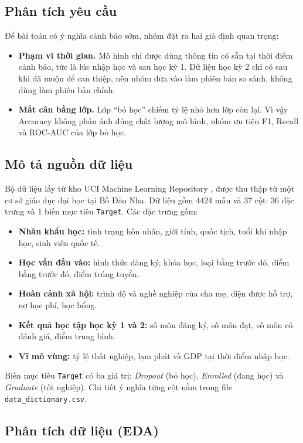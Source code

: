 \documentclass[12pt,a4paper]{article}
\begin{document}
\subsection{Phân tích yêu cầu}
Để bài toán có ý nghĩa cảnh báo sớm, nhóm đặt ra hai giả định quan trọng:
\begin{itemize}
  \item \textbf{Phạm vi thời gian.} Mô hình chỉ được dùng thông tin có sẵn tại thời điểm cảnh báo, tức là lúc nhập học và sau học kỳ 1. Dữ liệu học kỳ 2 chỉ có sau khi đã muộn để can thiệp, nên nhóm đưa vào làm phiên bản so sánh, không dùng làm phiên bản chính.
  \item \textbf{Mất cân bằng lớp.} Lớp ``bỏ học'' chiếm tỷ lệ nhỏ hơn lớp còn lại. Vì vậy Accuracy không phản ánh đúng chất lượng mô hình, nhóm ưu tiên F1, Recall và ROC-AUC của lớp bỏ học.
\end{itemize}

\subsection{Mô tả nguồn dữ liệu}
Bộ dữ liệu lấy từ kho UCI Machine Learning Repository \cite{realinho2021}, được thu thập từ một cơ sở giáo dục đại học tại Bồ Đào Nha. Dữ liệu gồm 4424 mẫu và 37 cột: 36 đặc trưng và 1 biến mục tiêu \texttt{Target}. Các đặc trưng gồm:
\begin{itemize}
  \item \textbf{Nhân khẩu học:} tình trạng hôn nhân, giới tính, quốc tịch, tuổi khi nhập học, sinh viên quốc tế.
  \item \textbf{Học vấn đầu vào:} hình thức đăng ký, khóa học, loại bằng trước đó, điểm bằng trước đó, điểm trúng tuyển.
  \item \textbf{Hoàn cảnh xã hội:} trình độ và nghề nghiệp của cha mẹ, diện được hỗ trợ, nợ học phí, học bổng.
  \item \textbf{Kết quả học tập học kỳ 1 và 2:} số môn đăng ký, số môn đạt, số môn có đánh giá, điểm trung bình.
  \item \textbf{Vĩ mô vùng:} tỷ lệ thất nghiệp, lạm phát và GDP tại thời điểm nhập học.
\end{itemize}
Biến mục tiêu \texttt{Target} có ba giá trị: \textit{Dropout} (bỏ học), \textit{Enrolled} (đang học) và \textit{Graduate} (tốt nghiệp). Chi tiết ý nghĩa từng cột nằm trong file \texttt{data\_dictionary.csv}.

\subsection{Phân tích dữ liệu (EDA)}
\end{document}
